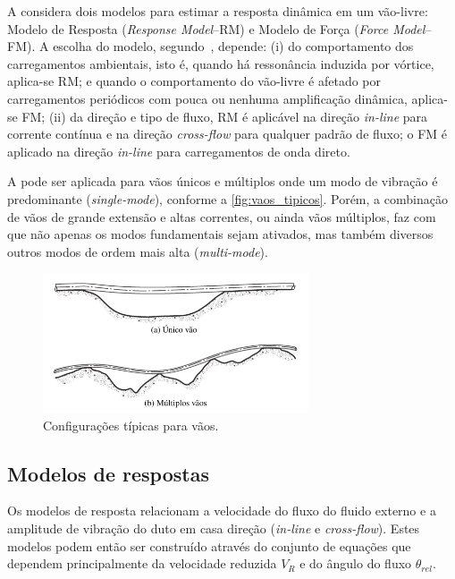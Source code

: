 A  considera dois modelos para estimar a resposta dinâmica em um vão-livre: Modelo de Resposta (\textit{Response Model}--RM) e Modelo de Força (\textit{Force Model}--FM).
A escolha do modelo, segundo~, depende: (i) do comportamento dos carregamentos ambientais, isto é, quando há ressonância induzida por vórtice, aplica-se RM\@; e quando o comportamento do vão-livre é afetado por carregamentos periódicos com pouca ou nenhuma amplificação dinâmica, aplica-se FM\@; (ii) da direção e tipo de fluxo, RM é aplicável na direção \textit{in-line} para corrente contínua e na direção \textit{cross-flow} para qualquer padrão de fluxo; o FM é aplicado na direção \textit{in-line} para carregamentos de onda direto.

A  pode ser aplicada para vãos únicos e múltiplos onde um modo de vibração é predominante (\textit{single-mode}), conforme a \autoref{fig:vaos_tipicos}.
Porém, a combinação de vãos de grande extensão e altas correntes, ou ainda vãos múltiplos, faz com que não apenas os modos fundamentais sejam ativados, mas também diversos outros modos de ordem mais alta (\textit{multi-mode}).

\begin{figure}[!ht]
	\centering
    \caption{Configurações típicas para vãos.}\label{fig:vaos_tipicos}
	\includegraphics[width=0.7\textwidth]{imagens/vaos_tipicos}
\end{figure}


\subsection{Modelos de respostas}

Os modelos de resposta relacionam a velocidade do fluxo do fluido externo e a amplitude de vibração do duto em casa direção (\textit{in-line} e \textit{cross-flow}). Estes modelos podem então ser construído através do conjunto de equações que dependem principalmente da velocidade reduzida $V_R$ e do ângulo do fluxo $\theta_\mathit{rel}$.

